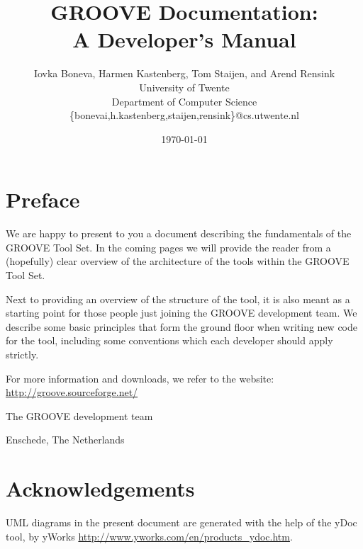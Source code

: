 \documentclass[twoside]{report}
\title{
GROOVE Documentation: \\
A Developer's Manual
}
\author{
Iovka Boneva, Harmen Kastenberg, Tom Staijen, and Arend Rensink \\
University of Twente\\
Department of Computer Science\\
\{bonevai,h.kastenberg,staijen,rensink\}@cs.utwente.nl
}
\date{\today}
\begin{document}
\maketitle

\cleardoublepage
\chapter*{Preface}

We are happy to present to you a document describing the fundamentals of the GROOVE Tool Set. In the coming pages we will provide the reader from a (hopefully) clear overview of the architecture of the tools within the GROOVE Tool Set.

Next to providing an overview of the structure of the tool, it is also meant as a starting point for those people just joining the GROOVE development team. We describe some basic principles that form the ground floor when writing new code for the tool, including some conventions which each developer should apply strictly.

For more information and downloads, we refer to the \GROOVE website: \url{http://groove.sourceforge.net/}

\vspace{0.2in}
\noindent
\hfill The GROOVE development team

\noindent
\hfill Enschede, The Netherlands

\tableofcontents

\cleardoublepage



\cleardoublepage


\cleardoublepage


\cleardoublepage


%

\cleardoublepage


\cleardoublepage


\chapter*{Acknowledgements}

UML diagrams in the present document are generated with the help of the
yDoc tool, by yWorks \url{http://www.yworks.com/en/products_ydoc.htm}.

\newpage


\end{document}

